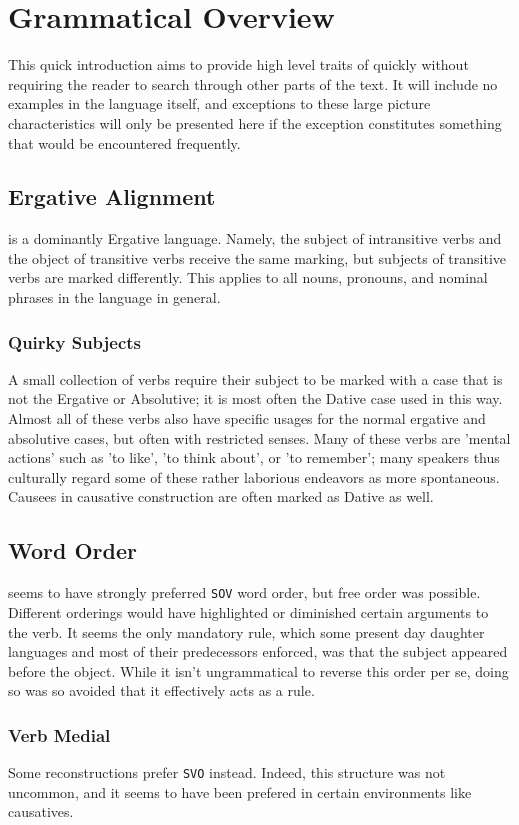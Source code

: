 \section{Grammatical Overview}
This quick introduction aims to provide high level traits of \langname quickly without requiring the reader to search through other parts of the text. It will include no examples in the language itself, and exceptions to these large picture characteristics will only be presented here if the exception constitutes something that would be encountered frequently.
\subsection{Ergative Alignment}
\langname is a dominantly Ergative language. Namely, the subject of intransitive verbs and the object of transitive verbs receive the same marking, but subjects of transitive verbs are marked differently. This applies to all nouns, pronouns, and nominal phrases in the language in general.
\subsubsection{Quirky Subjects}
A small collection of verbs require their subject to be marked with a case that is not the Ergative or Absolutive; it is most often the Dative case used in this way. Almost all of these verbs also have specific usages for the normal ergative and absolutive cases, but often with restricted senses. Many of these verbs are 'mental actions' such as 'to like', 'to think about', or 'to remember'; many speakers thus culturally regard some of these rather laborious endeavors as more spontaneous. Causees in causative construction are often marked as Dative as well.
\subsection{Word Order}
\langname seems to have strongly preferred \texttt{SOV} word order, but free order was possible. Different orderings would have highlighted or diminished certain arguments to the verb. It seems the only mandatory rule, which some present day daughter languages and most of their predecessors enforced, was that the subject appeared before the object. While it isn't ungrammatical to reverse this order per se, doing so was so avoided that it effectively acts as a rule.
\subsubsection{Verb Medial}
Some reconstructions prefer \texttt{SVO} instead. Indeed, this structure was not uncommon, and it seems to have been prefered in certain environments like causatives.
